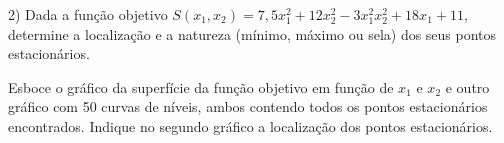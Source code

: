 2) Dada a função objetivo \( S(x_1, x_2) = 7,5x_1^2 + 12x_2^2 - 3x_1^2x_2^2 + 18x_1 + 11 \), determine a localização e a natureza (mínimo, máximo ou sela) dos seus pontos estacionários.

Esboce o gráfico da superfície da função objetivo em função de \(x_1\) e \(x_2\) e outro gráfico com 50 curvas de níveis, ambos contendo todos os pontos estacionários encontrados. Indique no segundo gráfico a localização dos pontos estacionários.
